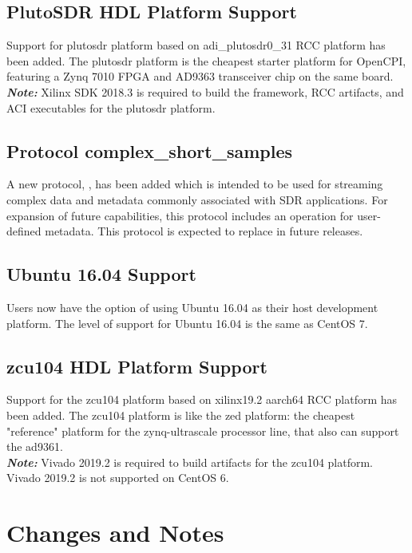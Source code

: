 \subsection{PlutoSDR HDL Platform Support}
\label{sec:17_plutosdr}
Support for plutosdr platform based on adi\_{}plutosdr0\_{}31 RCC platform has been added. The plutosdr platform is the cheapest starter platform for OpenCPI, featuring a Zynq 7010 FPGA and AD9363 transceiver chip on the same board.\\

\textit{\textbf{Note:}} Xilinx SDK 2018.3 is required to build the framework, RCC artifacts, and ACI executables for the plutosdr platform.

\subsection{Protocol complex\_{}short\_{}samples}
\label{sec:17_css}
A new protocol, , has been added which is intended to be used for streaming complex data and metadata commonly associated with SDR applications. For expansion of future capabilities, this protocol includes an operation for user-defined metadata. This protocol is expected to replace  in future releases.

\subsection{Ubuntu 16.04 Support}
\label{sec:17_ubuntu_16.04}
Users now have the option of using Ubuntu 16.04 as their host development platform. The level of support for Ubuntu 16.04 is the same as CentOS 7.

\subsection{zcu104 HDL Platform Support}
\label{sec:17_zcu104}
Support for the zcu104 platform based on xilinx19.2 aarch64 RCC platform has been added. The zcu104 platform is like the zed platform: the cheapest "reference" platform for the zynq-ultrascale processor line, that
also can support the ad9361.\\

\textit{\textbf{Note:}} Vivado 2019.2 is required to build artifacts for the zcu104 platform. Vivado 2019.2 is not supported on CentOS 6.


\section{Changes and Notes}

